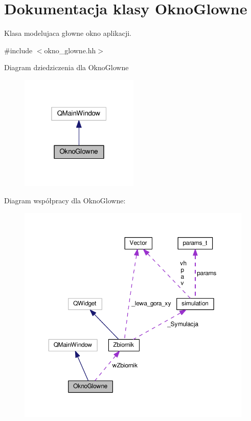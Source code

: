 \hypertarget{class_okno_glowne}{\section{Dokumentacja klasy Okno\-Glowne}
\label{class_okno_glowne}
}


Klasa modelujaca głowne okno aplikacji.  




{\ttfamily \#include $<$okno\-\_\-glowne.\-hh$>$}



Diagram dziedziczenia dla Okno\-Glowne\nopagebreak
\begin{figure}[H]
\begin{center}
\leavevmode
\includegraphics[width=160pt]{class_okno_glowne__inherit__graph}
\end{center}
\end{figure}


Diagram współpracy dla Okno\-Glowne\-:\nopagebreak
\begin{figure}[H]
\begin{center}
\leavevmode
\includegraphics[width=350pt]{class_okno_glowne__coll__graph}
\end{center}
\end{figure}
